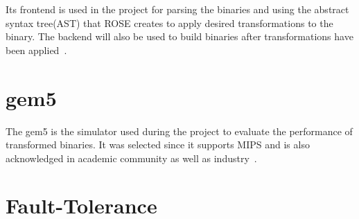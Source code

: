 Its frontend is used in the project for parsing the binaries and using
the abstract syntax tree(AST) that ROSE creates to apply desired
transformations to the binary. The backend will also be used to build
binaries after transformations have been applied~\cite{rose}.

\section{gem5}
The gem5 is the simulator used during the project to evaluate the performance
of transformed binaries. It was selected since it supports MIPS and
is also acknowledged in academic community as well as industry~\cite{gem5}.

\section{Fault-Tolerance}

